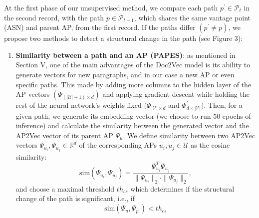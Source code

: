 \documentclass[10pt,journal]{IEEEtran}
\begin{document}
At the first phase of our unsupervised method, we compare each path $p^{\prime} \in \mathcal{P}_{t}$ in the second record, with the path $p \in \mathcal{P}_{t-1}$, which shares the same vantage point (ASN) and parent AP, from the first record. If the paths differ $(p^{\prime} \neq p)$, we propose two methods to detect a structural change in the path (see Figure 3):

\begin{enumerate}
    \item \textbf{Similarity between a path and an AP (PAPES)}: as mentioned in Section V, one of the main advantages of the Doc2Vec model is its ability to generate vectors for new paragraphs, and in our case a new AP or even specific paths. This made by adding more columns to the hidden layer of the AP vectors $(\Psi_{(|\mathcal{U}|+1)\times d})$ and applying gradient descent while holding the rest of the neural network's weights fixed $(\Phi_{|\mathcal{V}|\times d}$ and $\Phi_{d\times|\mathcal{V}|}^{\prime})$. Then, for a given path, we generate its embedding vector (we choose to run 50 epochs of inference) and calculate the similarity between the generated vector and the AP2Vec vector of its parent AP $\Psi_{u}$. We define similarity between two AP2Vec vectors $\Psi_{u_{i}},\Psi_{u_{j}} \in \mathbb{R}^{d}$ of the corresponding APs $u_{i},u_{j} \in \mathcal{U}$ as the cosine similarity:
    \begin{equation}
    \text{sim}(\Psi_{u_{i}},\Psi_{u_{j}}) = \frac{\Psi_{u_{i}}^{T}\Psi_{u_{j}}}{\|\Psi_{u_{i}}\|_{2} \cdot \|\Psi_{u_{j}}\|_{2}},
    \end{equation}
    and choose a maximal threshold $th_{cs}$ which determines if the structural change of the path is significant, i.e., if
    \begin{equation}
    \text{sim}(\Psi_{u},\Psi_{p^{\prime}}) < th_{cs}
    \end{equation}
    

\end{enumerate}
\end{document}
